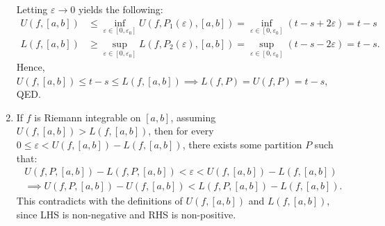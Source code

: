 \begin{enumerate}[label=\textbf{1A.\arabic*}]
    Letting \( \varepsilon \to 0\) yields the following:
    \begin{align*}
      U(f, [a, b]) &\le \inf_{\varepsilon \in [0, \varepsilon_{0}]} U(f,
      P_{1}(\varepsilon), [a, b]) = \inf_{\varepsilon \in [0, \varepsilon_{0}]}
      (t-s+2\varepsilon) = t - s\\
      L(f, [a, b]) &\ge \sup_{\varepsilon \in [0, \varepsilon_{0}]} L(f,
      P_{2}(\varepsilon), [a, b]) = \sup_{\varepsilon \in [0, \varepsilon_{0}]}
      (t-s-2\varepsilon) = t - s
    .\end{align*}
    Hence, \( U(f, [a, b]) \le t - s \le L(f, [a, b]) \implies L(f, P) = U(f, P) = t -s
    \), QED.
  \item \label{1A3} If \( f \) is Riemann integrable on \( [a, b] \), assuming
    \( U(f, [a, b]) > L(f, [a, b]) \), then for every \(
    0\le  \varepsilon < U(f, [a, b]) - L(f, [a, b]) \), there exists some
    partition \( P
    \) such that:
    \begin{gather*}
    U(f, P, [a, b]) - L(f, P, [a, b]) < \varepsilon < U(f, [a,
    b]) - L(f, [a, b])\\
    \implies U(f, P, [a, b]) - U(f, [a, b]) < L(f, P, [a, b]) - L(f, [a, b]).
    \end{gather*}
    This contradicts with the definitions of \( U(f, [a, b]) \) and \( L(f, [a,
    b]) \), since LHS is non-negative and RHS is non-positive.


\end{enumerate}
